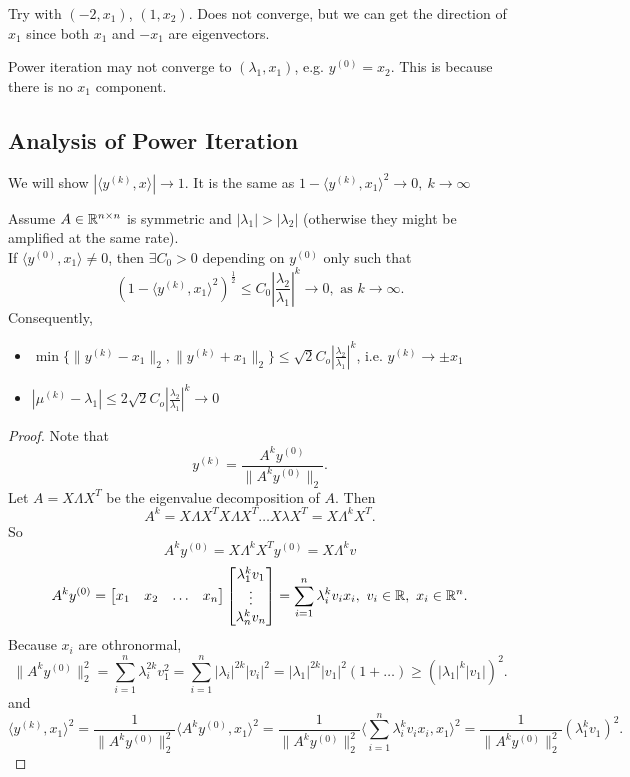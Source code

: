 \documentclass[../main/main.tex]{subfiles}
\begin{document}
\begin{remark}
	Try with $\left( -2,x_1 \right) $, $(1,x_2)$. Does not converge, but we can get the direction of $x_1$ since both $x_1$ and $-x_1$ are eigenvectors.\\

\end{remark}
\begin{remark}
Power iteration may not converge to $\left( \lambda_1,x_1 \right) $, e.g. $y^{(0)}=x_2$. This is because there is no $x_1$ component.
	
\end{remark}
\subsection{Analysis of Power Iteration}
We will show $|\langle y^{(k)},x\rangle|\to 1$. It is the same as $1-\langle y^{(k)},x_1\rangle^{2}\to 0,\ k\to \infty$
\begin{theorem}
	Assume $A\in \mathbb{R}^{n\times n}$ is symmetric and $|\lambda_1|>|\lambda_2|$ (otherwise they might be amplified at the same rate).\\

	If $\langle y^{(0)}, x_1\rangle \neq 0$, then $\exists  C_0>0$ depending on $y^{(0)}$ only such that  \[
		\left( 1-\langle y^{(k)},x_1\rangle^2 \right) ^{\frac{1}{2}}\le C_0 \left| \frac{\lambda_2}{\lambda_1} \right|^{k}\to 0, \text{ as } k\to \infty 
	.\] Consequently, 
	\begin{itemize}
	\item $\min \{\|y^{(k)}-x_1\|_2,\|y^{(k)}+x_1\|_2\}\le \sqrt{2}C_o \left| \frac{\lambda_2}{\lambda_1} \right| ^{k}$, i.e. $y^{(k)}\to \pm x_1$
		\item $|\mu^{(k)}-\lambda_1|\le 2\sqrt{2} C_o\left| \frac{\lambda_2}{\lambda_1} \right| ^{k}\to 0$
	\end{itemize}
\end{theorem}
\begin{proof}
	Note that \[
		y^{(k)}=\frac{A^{k}y^{(0)}}{\|A^{k}y^{(0)}\|_2}
	.\] 
	Let $A=X\Lambda X^{T}$ be the eigenvalue decomposition of $A$. Then  \[
		A^{k}=X\Lambda X^{T} X\Lambda X^{T}\ldots X\lambda X^{T}=X\Lambda^{k}X^{T}
	.\] So  \[
	A^{k}y^{(0)}=X\Lambda^{k}X^{T}y^{(0)}=X\Lambda^{k}v
	\] \[
	A^{k}y^{(0)}=\begin{bmatrix} x_1&x_2&\ldots&x_n \end{bmatrix}\begin{bmatrix} \lambda_1^{k} v_1\\ \vdots\\ \lambda_n^{k} v_n\end{bmatrix}=\sum_{i=1}^{n} \lambda_i^{k}v_ix_i,\ v_i\in \mathbb{R},\ x_i\in \mathbb{R}^{n} 
	.\] Because $x_i$ are othronormal,  \[
	\|A^{k}y^{(0)}\|^{2}_2=\sum_{i=1}^{n} \lambda^{2k}_i v^2_1 = \sum_{i=1}^{n} |\lambda_i|^{2k}|v_i|^{2}=|\lambda_1|^{2k}|v_1|^2\left( 1+\ldots \right)\ge \left( |\lambda_1|^{k}|v_1| \right)^2  
	.\]  and  \[
	\langle y^{(k)}, x_1\rangle^2=\frac{1}{\|A^ky^{(0)}\|^2_2}\langle A^ky^{(0)},x_1\rangle^2=\frac{1}{\|A^ky^{(0)}\|^2_2}\langle \sum_{i=1}^{n} \lambda_i^{k}v_ix_i,x_1\rangle^2=\frac{1}{\|A^ky^{(0)}\|^2_2}\left( \lambda_1^{k}v_1 \right)^2 
	.\] 
\end{proof}
\end{document}
